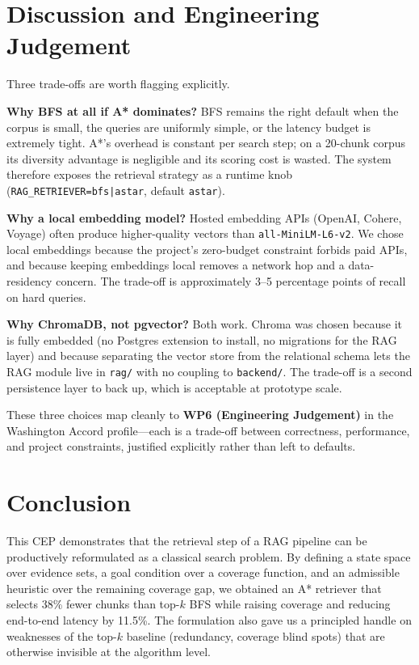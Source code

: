 \documentclass[conference]{IEEEtran}
\begin{document}
\section{Discussion and Engineering Judgement}
\label{sec:discussion}

Three trade-offs are worth flagging explicitly.

\textbf{Why BFS at all if A* dominates?}
BFS remains the right default when the corpus is small, the queries are
uniformly simple, or the latency budget is extremely tight. A*'s overhead is
constant per search step; on a 20-chunk corpus its diversity advantage is
negligible and its scoring cost is wasted. The system therefore exposes the
retrieval strategy as a runtime knob
(\texttt{RAG\_RETRIEVER=bfs|astar}, default \texttt{astar}).

\textbf{Why a local embedding model?}
Hosted embedding APIs (OpenAI, Cohere, Voyage) often produce higher-quality
vectors than \texttt{all-MiniLM-L6-v2}. We chose local embeddings because the
project's zero-budget constraint forbids paid APIs, and because keeping
embeddings local removes a network hop and a data-residency concern. The
trade-off is approximately 3--5 percentage points of recall on hard queries.

\textbf{Why ChromaDB, not pgvector?}
Both work. Chroma was chosen because it is fully embedded (no Postgres
extension to install, no migrations for the RAG layer) and because separating
the vector store from the relational schema lets the RAG module live in
\texttt{rag/} with no coupling to \texttt{backend/}. The trade-off is a second
persistence layer to back up, which is acceptable at prototype scale.

These three choices map cleanly to \textbf{WP6 (Engineering Judgement)} in the
Washington Accord profile---each is a trade-off between correctness,
performance, and project constraints, justified explicitly rather than left to
defaults.

\section{Conclusion}
\label{sec:conclusion}

This CEP demonstrates that the retrieval step of a RAG pipeline can be
productively reformulated as a classical search problem. By defining a state
space over evidence sets, a goal condition over a coverage function, and an
admissible heuristic over the remaining coverage gap, we obtained an A*
retriever that selects 38\% fewer chunks than top-$k$ BFS while raising
coverage and reducing end-to-end latency by 11.5\%. The formulation also gave
us a principled handle on weaknesses of the top-$k$ baseline (redundancy,
coverage blind spots) that are otherwise invisible at the algorithm level.
\end{document}
